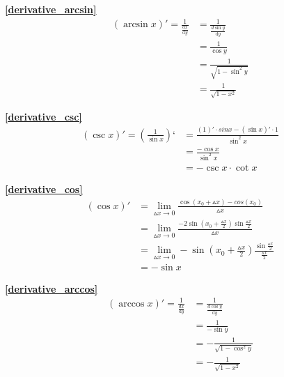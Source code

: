 \textbf{\large \ref{derivative_arcsin}}
\begin{displaymath}
    \begin{split}
        (\arcsin x)'=\frac{1}{\frac{dx}{\mathrm{d}{y}}}&=\frac{1}{\frac{d\sin y}{\mathrm{d}{y}}}\\
        &=\frac{1}{\cos y}\\
        &=\frac{1}{\sqrt{1-\sin^2 y}}\\
        &=\frac{1}{\sqrt{1-x^2}}
    \end{split}
\end{displaymath}

\textbf{\large \ref{derivative_csc}}
\begin{displaymath}
    \begin{split}
        (\csc x)'=(\frac{1}{\sin x})‘&=\frac{(1)'\cdot sin x-(\sin x)'\cdot 1}{\sin^2x}\\
        &=\frac{-\cos x}{\sin^2x}\\
        &=-\csc x\cdot\cot x
    \end{split}
\end{displaymath}

\textbf{\large \ref{derivative_cos}}
\begin{displaymath}
    \begin{split}
        (\cos x)'&=\lim\limits_{\vartriangle x\to 0}\frac{\cos(x_0+\vartriangle x)-cos(x_0)}{\vartriangle x}\\
        &=\lim\limits_{\vartriangle x\to 0}\frac{-2\sin \left(x_0+\frac{\vartriangle x}{2}\right)\sin\frac{\vartriangle x}{2}}{\vartriangle x}\\
        &=\lim\limits_{\vartriangle x\to 0}-\sin \left(x_0+\frac{\vartriangle x}{2}\right)\frac{\sin\frac{\vartriangle x}{2}}{\frac{\vartriangle x}{2}}\\
        &=-\sin x
    \end{split}
\end{displaymath}

\textbf{\large \ref{derivative_arccos}}
\begin{displaymath}
    \begin{split}
        (\arccos x)'=\frac{1}{\frac{dx}{\mathrm{d}{y}}}&=\frac{1}{\frac{d\cos y}{\mathrm{d}{y}}}\\
        &=\frac{1}{-\sin y}\\
        &=-\frac{1}{\sqrt{1-\cos^2 y}}\\
        &=-\frac{1}{\sqrt{1-x^2}}
    \end{split}
\end{displaymath}


